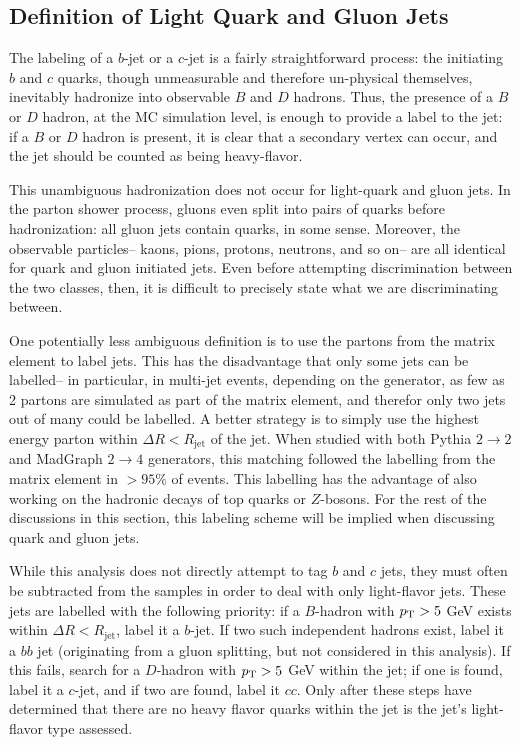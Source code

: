 \subsection{Definition of Light Quark and Gluon Jets}
\label{jet-reconstruction:qg:definition}

The labeling of a $b$-jet or a $c$-jet is a fairly straightforward process: the initiating $b$ and $c$ quarks, though unmeasurable and therefore un-physical themselves, inevitably hadronize into observable $B$ and $D$ hadrons. Thus, the presence of a $B$ or $D$ hadron, at the MC simulation level, is enough to provide a label to the jet: if a $B$ or $D$ hadron is present, it is clear that a secondary vertex can occur, and the jet should be counted as being heavy-flavor.

This unambiguous hadronization does not occur for light-quark and gluon jets. In the parton shower process, gluons even split into pairs of quarks before hadronization: all gluon jets contain quarks, in some sense. Moreover, the observable particles-- kaons, pions, protons, neutrons, and so on-- are all identical for quark and gluon initiated jets. Even before attempting discrimination between the two classes, then, it is difficult to precisely state what we are discriminating between.

One potentially less ambiguous definition is to use the partons from the matrix element to label jets. This has the disadvantage that only some jets can be labelled-- in particular, in multi-jet events, depending on the generator, as few as 2 partons are simulated as part of the matrix element, and therefor only two jets out of many could be labelled. A better strategy is to simply use the highest energy parton within $\Delta R < R_\mathrm{jet}$ of the jet. When studied with both Pythia $2\rightarrow2$ and MadGraph $2\rightarrow4$ generators, this matching followed the labelling from the matrix element in $> 95\%$ of events. This labelling has the advantage of also working on the hadronic decays of top quarks or $Z$-bosons. For the rest of the discussions in this section, this labeling scheme will be implied when discussing quark and gluon jets.

While this analysis does not directly attempt to tag $b$ and $c$ jets, they must often be subtracted from the samples in order to deal with only light-flavor jets. These jets are labelled with the following priority: if a $B$-hadron with $p_{\text{T}} > 5$ GeV exists within $\Delta R < R_\mathrm{jet}$, label it a $b$-jet. If two such independent hadrons exist, label it a $bb$ jet (originating from a gluon splitting, but not considered in this analysis). If this fails, search for a $D$-hadron with $p_{\text{T}} > 5$ GeV within the jet; if one is found, label it a $c$-jet, and if two are found, label it $cc$. Only after these steps have determined that there are no heavy flavor quarks within the jet is the jet's light-flavor type assessed.

